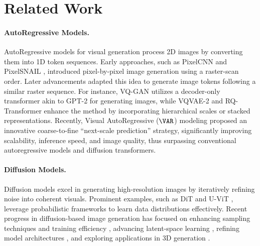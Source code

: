 \section{Related Work}
\label{sec:related_work}

\paragraph{AutoRegressive Models.} AutoRegressive models for visual generation \cite{dyh+21,dzht22} process 2D images by converting them into 1D token sequences. Early approaches, such as PixelCNN \cite{vke+16} and PixelSNAIL \cite{cmr+18}, introduced pixel-by-pixel image generation using a raster-scan order. Later advancements \cite{rvav19,ero21,lkk+22} adapted this idea to generate image tokens following a similar raster sequence. For instance, VQ-GAN \cite{ero21} utilizes a decoder-only transformer akin to GPT-2 for generating images, while VQVAE-2 \cite{rvav19} and RQ-Transformer \cite{lkk+22} enhance the method by incorporating hierarchical scales or stacked representations. Recently, Visual AutoRegressive ($\VAR$) modeling \cite{tjy+24} proposed an innovative coarse-to-fine ``next-scale prediction'' strategy, significantly improving scalability, inference speed, and image quality, thus surpassing conventional autoregressive models and diffusion transformers.

\paragraph{Diffusion Models.} Diffusion models \cite{hja20,rbl+22} excel in generating high-resolution images by iteratively refining noise into coherent visuals. Prominent examples, such as DiT \cite{px23} and U-ViT \cite{bnx+23}, leverage probabilistic frameworks to learn data distributions effectively. Recent progress in diffusion-based image generation has focused on enhancing sampling techniques and training efficiency \cite{se19,sme20,lzb+22,hwl+24,cgl+25_high,ssz+25_dit}, advancing latent-space learning \cite{rbl+22,wsd+24,wxz+24,lzw+24}, refining model architectures \cite{hsc+22,px23,lsss24,wcz+23,xsg+24}, and exploring applications in 3D generation \cite{pjbm22,wlw+24,xlc+24,cgl+25_text}.



